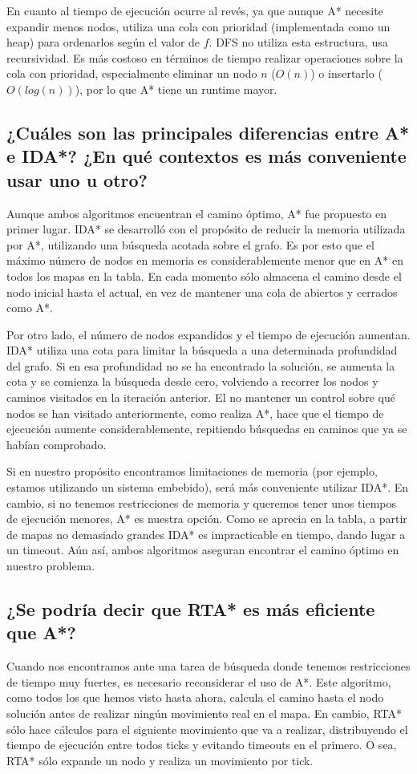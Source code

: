 \documentclass[12pt]{article} %
\begin{document}
En cuanto al tiempo de ejecución ocurre al revés, ya que aunque A* necesite expandir menos nodos, utiliza una cola con prioridad (implementada como un heap) para ordenarlos según el valor de $f$. DFS no utiliza esta estructura, usa recursividad. Es más costoso en términos de tiempo realizar operaciones sobre la cola con prioridad, especialmente eliminar un nodo $n$ ($O(n)$) o insertarlo ($O(log(n))$), por lo que A* tiene un runtime mayor.

\subsection{¿Cuáles son las principales diferencias entre A* e IDA*? ¿En qué contextos es
más conveniente usar uno u otro?}
Aunque ambos algoritmos encuentran el camino óptimo, A* fue propuesto en primer lugar. IDA* se desarrolló con el propósito de reducir la memoria utilizada por A*, utilizando una búsqueda acotada sobre el grafo. Es por esto que el máximo número de nodos en memoria es considerablemente menor que en A* en todos los mapas en la tabla. En cada momento sólo almacena el camino desde el nodo inicial hasta el actual, en vez de mantener una cola de abiertos y cerrados como A*.

Por otro lado, el número de nodos expandidos y el tiempo de ejecución aumentan. IDA* utiliza una cota para limitar la búsqueda a una determinada profundidad del grafo. Si en esa profundidad no se ha encontrado la solución, se aumenta la cota y se comienza la búsqueda desde cero, volviendo a recorrer los nodos y caminos visitados en la iteración anterior. El no mantener un control sobre qué nodos se han visitado anteriormente, como realiza A*, hace que el tiempo de ejecución aumente considerablemente, repitiendo búsquedas en caminos que ya se habían comprobado.

Si en nuestro propósito encontramos limitaciones de memoria (por ejemplo, estamos utilizando un sistema embebido), será más conveniente utilizar IDA*. En cambio, si no tenemos restricciones de memoria y queremos tener unos tiempos de ejecución menores, A* es nuestra opción. Como se aprecia en la tabla, a partir de mapas no demasiado grandes IDA* es impracticable en tiempo, dando lugar a un timeout. Aún así, ambos algoritmos aseguran encontrar el camino óptimo en nuestro problema.

\subsection{¿Se podría decir que RTA* es más eficiente que A*?}
Cuando nos encontramos ante una tarea de búsqueda donde tenemos restricciones de tiempo muy fuertes, es necesario reconsiderar el uso de A*. Este algoritmo, como todos los que hemos visto hasta ahora, calcula el camino hasta el nodo solución antes de realizar ningún movimiento real en el mapa. En cambio, RTA* sólo hace cálculos para el siguiente movimiento que va a realizar, distribuyendo el tiempo de ejecución entre todos ticks y evitando timeouts en el primero. O sea, RTA* sólo expande un nodo y realiza un movimiento por tick.
\end{document}

